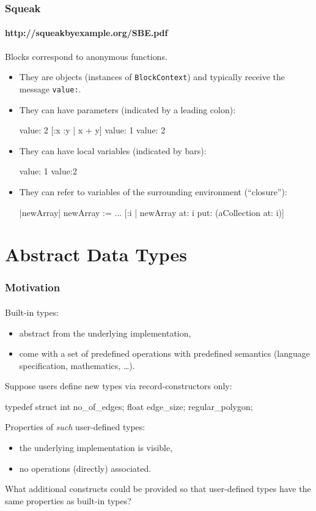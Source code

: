 \documentclass{beamer}
\begin{document}
\begin{frame}[fragile]
\frametitle{Squeak}
\framesubtitle{http://squeakbyexample.org/SBE.pdf}
Blocks %
correspond to anonymous functions.

\begin{itemize}
\item They are objects (instances of \texttt{BlockContext}) and
typically receive the message \texttt{value:}.
\item They can have parameters (indicated by a leading colon):

\begin{cplus3}
[:x | 1 + x] value: 2
[:x :y | x + y] value: 1 value: 2
\end{cplus3}

\item They can  have local variables (indicated by bars):
\begin{cplus3}
[:x :y |  |z| z := x + y] value: 1 value:2 
\end{cplus3}

\item They can refer to variables of the surrounding environment
(``closure''):
\begin{cplus3}
|newArray|
newArray :=  ... 
[:i | newArray at: i put: (aCollection at: i)]
\end{cplus3}
\end{itemize}

\end{frame}


\section{Abstract Data Types}

\begin{frame}[fragile]
\frametitle{Motivation}
\framesubtitle{}
Built-in types:
\begin{itemize}
\item abstract from the underlying implementation, 
\item come with a set of predefined operations with predefined semantics
(language specification, mathematics, \ldots).
\end{itemize}
\bigskip

Suppose users define new types via record-constructors only: 
\begin{cplus2}
       typedef struct {
          int   no_of_edges;
          float edge_size;
       } regular_polygon;
\end{cplus2}
Properties of \textit{such} user-defined types:
\begin{itemize}
\item the underlying implementation is visible,
\item no operations  (directly) associated. 
\end{itemize}
\bigskip

What additional constructs could be provided so that user-defined types
have the same properties as built-in types?

\end{frame}
\end{document}
